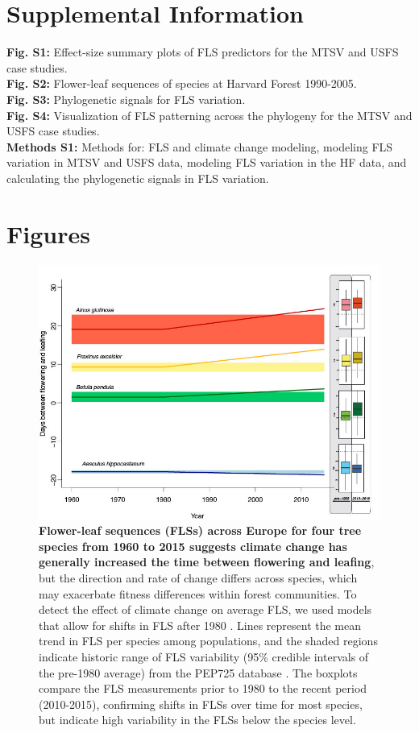 \documentclass[11pt]{article}
\begin{document}
\section*{Supplemental Information}
\textbf{Fig. S1:} Effect-size summary plots of FLS predictors for the MTSV and USFS case studies. \\
\textbf{Fig. S2:} Flower-leaf sequences of species at Harvard Forest 1990-2005.\\
\textbf{Fig. S3:} Phylogenetic signals for FLS variation.\\
\textbf{Fig. S4:} Visualization of FLS patterning across the phylogeny for the MTSV and USFS case studies.\\
\textbf{Methods S1:} Methods for: FLS and climate change modeling, modeling FLS variation in MTSV and USFS data, modeling FLS variation in the HF data, and calculating the phylogenetic signals in FLS variation.
\newpage
\section*{Figures}


\begin{figure}[h!]
    \centering
 \includegraphics[width=\textwidth]{..//..//PEP725/FLS_climate_change_final.jpg}
    \caption{\textbf{Flower-leaf sequences (FLSs) across Europe for four tree species from 1960 to 2015 suggests climate change has generally increased the time between flowering and leafing}, but the direction and rate of change differs across species, which may exacerbate fitness differences within forest communities. To detect the effect of climate change on average FLS, we used models that allow for shifts in FLS after 1980 \citep{Kharouba2018}. Lines represent the mean trend in FLS per species among populations, and the shaded regions indicate historic range of FLS variability (95\% credible intervals of the pre-1980 average) from the PEP725 database \citep{PEP725}. The boxplots compare the FLS measurements prior to 1980 to the recent period (2010-2015), confirming shifts in FLSs over time for most species, but indicate high variability in the FLSs below the species level.}
    \label{fig:climchange}
\end{figure}
\end{document}
